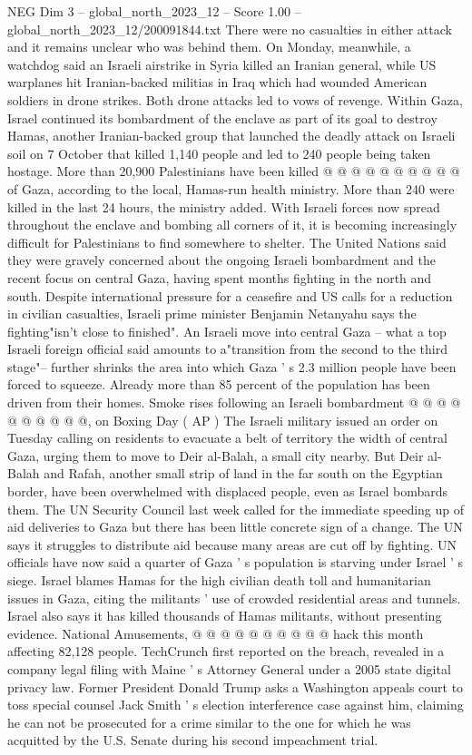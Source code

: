 \begin{textsample}{NEG Dim 3 – global\_north\_2023\_12 – Score 1.00 – global\_north\_2023\_12/200091844.txt}
There were no casualties in either attack and it remains unclear who was behind them.
On Monday, meanwhile, a watchdog said an Israeli airstrike in Syria killed an Iranian general, while US warplanes hit Iranian-backed militias in Iraq which had wounded American soldiers in drone strikes.
Both drone attacks led to vows of revenge.
Within Gaza, Israel continued its bombardment of the enclave as part of its goal to destroy Hamas, another Iranian-backed group that launched the deadly attack on Israeli soil on 7 October that killed 1,140 people and led to 240 people being taken hostage.
More than 20,900 Palestinians have been killed @ @ @ @ @ @ @ @ @ @ of Gaza, according to the local, Hamas-run health ministry.
More than 240 were killed in the last 24 hours, the ministry added.
With Israeli forces now spread throughout the enclave and bombing all corners of it, it is becoming increasingly difficult for Palestinians to find somewhere to shelter.
The United Nations said they were gravely concerned about the ongoing Israeli bombardment and the recent focus on central Gaza, having spent months fighting in the north and south.
Despite international pressure for a ceasefire and US calls for a reduction in civilian casualties, Israeli prime minister Benjamin Netanyahu says the fighting"isn't close to finished".
An Israeli move into central Gaza -- what a top Israeli foreign official said amounts to a"transition from the second to the third stage"-- further shrinks the area into which Gaza ' s 2.3 million people have been forced to squeeze.
Already more than 85 percent of the population has been driven from their homes.
Smoke rises following an Israeli bombardment @ @ @ @ @ @ @ @ @ @, on Boxing Day ( AP ) The Israeli military issued an order on Tuesday calling on residents to evacuate a belt of territory the width of central Gaza, urging them to move to Deir al-Balah, a small city nearby.
But Deir al-Balah and Rafah, another small strip of land in the far south on the Egyptian border, have been overwhelmed with displaced people, even as Israel bombards them.
The UN Security Council last week called for the immediate speeding up of aid deliveries to Gaza but there has been little concrete sign of a change.
The UN says it struggles to distribute aid because many areas are cut off by fighting.
UN officials have now said a quarter of Gaza ' s population is starving under Israel ' s siege.
Israel blames Hamas for the high civilian death toll and humanitarian issues in Gaza, citing the militants ' use of crowded residential areas and tunnels.
Israel also says it has killed thousands of Hamas militants, without presenting evidence.
National Amusements, @ @ @ @ @ @ @ @ @ @ hack this month affecting 82,128 people.
TechCrunch first reported on the breach, revealed in a company legal filing with Maine ' s Attorney General under a 2005 state digital privacy law.
Former President Donald Trump asks a Washington appeals court to toss special counsel Jack Smith ' s election interference case against him, claiming he can not be prosecuted for a crime similar to the one for which he was acquitted by the U.S.
Senate during his second impeachment trial.

\end{textsample}

